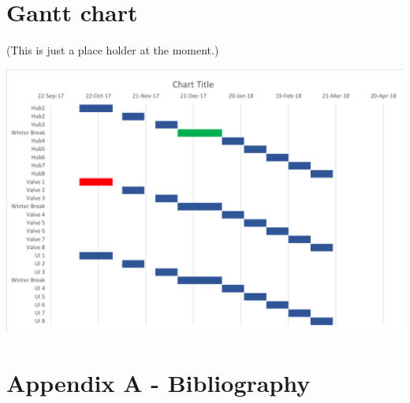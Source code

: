 \documentclass[onecolumn, draftclsnofoot,10pt, compsoc]{IEEEtran}
\begin{document}
	\section{Gantt chart}
	(This is just a place holder at the moment.)\par
	\noindent\includegraphics[width=\linewidth]{chart_cropped}
	
	\newpage
	\section{Appendix A - Bibliography}
	\nocite{*} %
	
	
	
\end{document}
